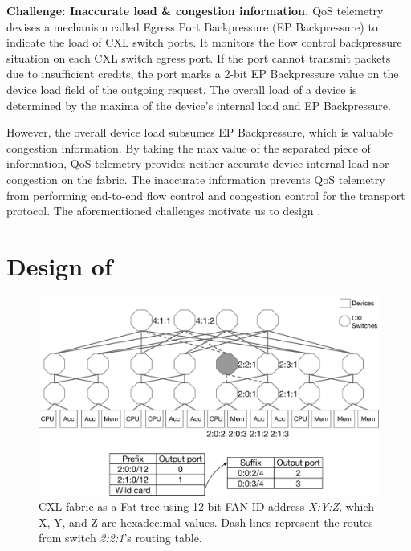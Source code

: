 \noindent \textbf{Challenge: Inaccurate load \& congestion information.}
QoS telemetry devises a mechanism called Egress Port Backpressure (EP Backpressure) to indicate the load of CXL switch ports.
%
It monitors the flow control backpressure situation on each CXL switch egress port. 
%
If the port cannot transmit packets due to insufficient credits, the port marks a 2-bit EP Backpressure value on the device load field of the outgoing request. 
%
The overall load of a device is determined by the maxima of the device's internal load and EP Backpressure. 

However, the overall device load subsumes EP Backpressure, which is valuable congestion information. 
%
By taking the max value of the separated piece of information, QoS telemetry provides neither accurate device internal load nor congestion on the fabric.
%
The inaccurate information prevents QoS telemetry from performing end-to-end flow control and congestion control for the transport protocol.
%
The aforementioned challenges motivate us to design \aurelia. 
%
\section{Design of \aurelia}
\label{sec:design}

\begin{figure}[t!]    
    \centering
    \includegraphics[width=0.9\columnwidth]{figure/aurelia/cxl-fat-tree-routing-table.eps}
    \caption{CXL fabric as a Fat-tree using 12-bit FAN-ID address \emph{X:Y:Z}, which X, Y, and Z are hexadecimal values. Dash lines represent the routes from switch \emph{2:2:1}'s routing table.} 
    \label{fig:cxl-fabric-overview}
\end{figure}

